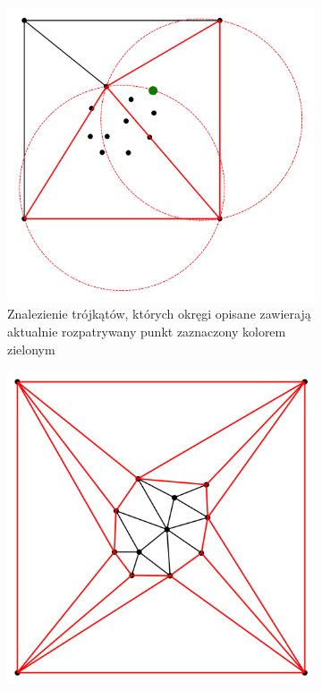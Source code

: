 \documentclass{myclass}
\begin{document}
\begin{figure}[ht]
    \centering
    \begin{subfigure}[b]{0.3\textwidth}
        \centering
        \includegraphics[width=\textwidth]{figs/visual2.png}
        \caption{Znalezienie trójkątów, których okręgi opisane zawierają aktualnie rozpatrywany punkt zaznaczony kolorem zielonym}
    \end{subfigure}  
    \hfill
    \begin{subfigure}[b]{0.3\textwidth}
        \centering
        \includegraphics[width=\textwidth]{figs/visual5.png}

\end{subfigure}
\end{figure}
\end{document}
